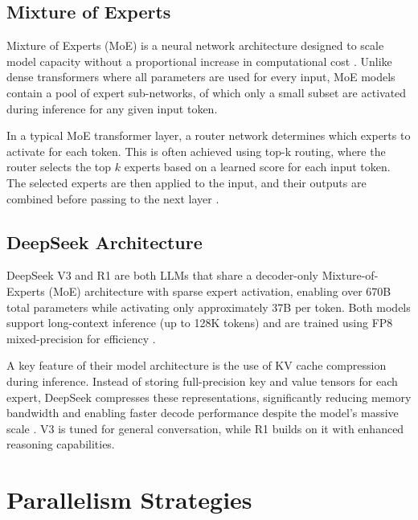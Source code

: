 \subsection{Mixture of Experts} 

Mixture of Experts (MoE) is a neural network architecture designed to scale model capacity without a proportional increase in computational cost \autocite{shazeerOutrageouslyLargeNeural2017}.
Unlike dense transformers where all parameters are used for every input, MoE models contain a pool of expert sub-networks, of which only a small subset are activated during inference for any given input token.

In a typical MoE transformer layer, a router network determines which experts to activate for each token.
This is often achieved using top-k routing, where the router selects the top $k$ experts based on a learned score for each input token.
The selected experts are then applied to the input, and their outputs are combined before passing to the next layer \autocite{lepikhinGShardScalingGiant2020}.


\subsection{DeepSeek Architecture}

DeepSeek V3 and R1 are both LLMs that share a decoder-only Mixture-of-Experts (MoE) architecture with sparse expert activation, enabling over 670B total parameters while activating only approximately 37B per token.
Both models support long-context inference (up to 128K tokens) and are trained using FP8 mixed-precision for efficiency \autocite{deepseek-aiDeepSeekR1IncentivizingReasoning2025}.

A key feature of their model architecture is the use of KV cache compression during inference.
Instead of storing full-precision key and value tensors for each expert, DeepSeek compresses these representations, significantly reducing memory bandwidth and enabling faster decode performance despite the model's massive scale \autocite{deepseek-aiDeepSeekV3TechnicalReport2025}.
V3 is tuned for general conversation, while R1 builds on it with enhanced reasoning capabilities.

\section{Parallelism Strategies}

